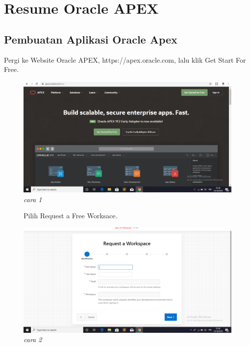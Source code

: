
\chapter*{Resume Oracle APEX}
\section*{Pembuatan Aplikasi Oracle Apex}
\begin{enumerate}

\item[1]Pergi ke Website Oracle APEX, https://apex.oracle.com, lalu klik Get Start For Free.

\begin{figure}[!htbp]
    \begin{center}
    \includegraphics[scale=0.2]{apex/apex1.png}
    \caption{\textit{cara 1}}
    \end{center}   
    \end{figure}
    
\begin{figure}[!htbp]
\item[2]Pilih Request a Free Worksace.

    \begin{center}
    \includegraphics[scale=0.2]{apex/apex2.png}
    \caption{\textit{cara 2}}
    \end{center}


\end{figure}
\end{enumerate}
